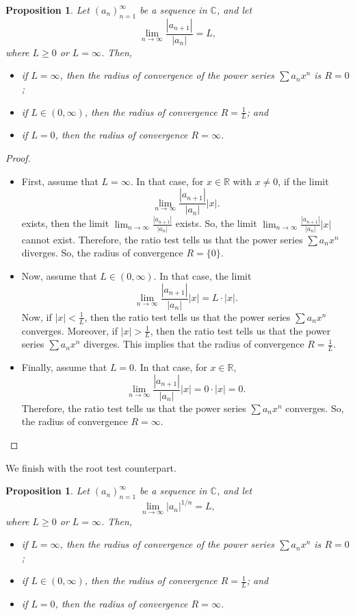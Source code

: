 \documentclass[a4paper, openany]{memoir}
\theoremstyle{definition}
\theoremstyle{plain}
\newtheorem{proposition}[definition]{Proposition}
\begin{document}
\begin{proposition}
Let $(a_n)_{n=1}^{\infty}$ be a sequence in $\mathbb{C}$, and let 
\[\lim_{n \to \infty} \frac{|a_{n+1}|}{|a_n|} = L,\]
where $L \geqslant 0$ or $L = \infty$. Then,
\begin{itemize}
    \item if $L = \infty$, then the radius of convergence of the power series $\sum a_n x^n$ is $R = 0$;
    \item if $L \in (0, \infty)$, then the radius of convergence $R = \frac{1}{L}$; and
    \item if $L = 0$, then the radius of convergence $R = \infty$.
\end{itemize}
\end{proposition}
\begin{proof}
\hspace*{0pt}
\begin{itemize}
    \item First, assume that $L = \infty$. In that case, for $x \in \mathbb{R}$ with $x \neq 0$, if the limit
    \[\lim_{n \to \infty} \frac{|a_{n+1}|}{|a_n|} |x|.\]
    exists, then the limit $\lim_{n \to \infty} \frac{|a_{n+1}|}{|a_n|}$ exists. So, the limit $\lim_{n \to \infty} \frac{|a_{n+1}|}{|a_n|} |x|$ cannot exist. Therefore, the ratio test tells us that the power series $\sum a_n x^n$ diverges. So, the radius of convergence $R = \{0\}$.
    
    \item Now, assume that $L \in (0, \infty)$. In that case, the limit
    \[\lim_{n \to \infty} \frac{|a_{n+1}|}{|a_n|} |x| = L \cdot |x|.\]
    Now, if $|x| < \frac{1}{L}$, then the ratio test tells us that the power series $\sum a_n x^n$ converges. Moreover, if $|x| > \frac{1}{L}$, then the ratio test tells us that the power series $\sum a_n x^n$ diverges. This implies that the radius of convergence $R = \frac{1}{L}$.
    
    \item Finally, assume that $L = 0$. In that case, for $x \in \mathbb{R}$,
    \[\lim_{n \to \infty} \frac{|a_{n+1}|}{|a_n|} |x| = 0 \cdot |x| = 0.\]
    Therefore, the ratio test tells us that the power series $\sum a_n x^n$ converges. So, the radius of convergence $R = \infty$.
\end{itemize}
\end{proof}
\noindent We finish with the root test counterpart.
\begin{proposition}
Let $(a_n)_{n=1}^{\infty}$ be a sequence in $\mathbb{C}$, and let 
\[\lim_{n \to \infty} |a_n|^{1/n} = L,\]
where $L \geqslant 0$ or $L = \infty$. Then,
\begin{itemize}
    \item if $L = \infty$, then the radius of convergence of the power series $\sum a_n x^n$ is $R = 0$;
    \item if $L \in (0, \infty)$, then the radius of convergence $R = \frac{1}{L}$; and
    \item if $L = 0$, then the radius of convergence $R = \infty$.
\end{itemize}
\end{proposition}
\end{document}
